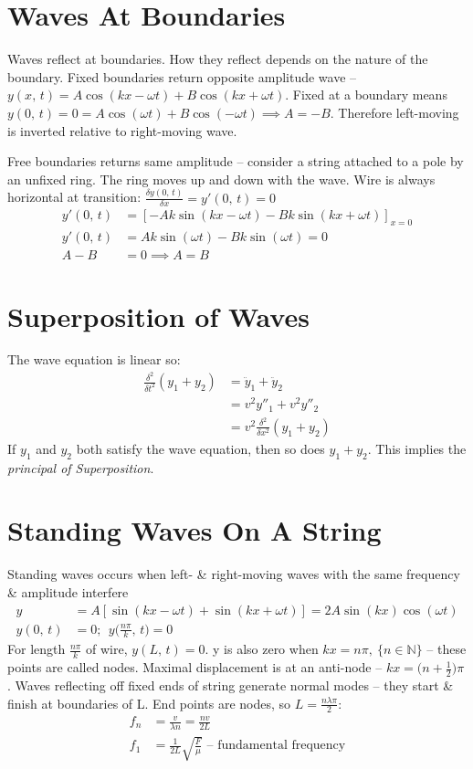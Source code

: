 \documentclass[a4paper, 11pt, normalem]{report}
\begin{document}
\section{Waves At Boundaries}
Waves reflect at boundaries.
How they reflect depends on the nature of the boundary.
Fixed boundaries return opposite amplitude wave -- $y(x,\,t) = A\cos{(kx - \omega t)} + B\cos{(kx + \omega t)}$.
Fixed at a boundary means $y(0,\,t) = 0 = A\cos{(\omega t)} + B\cos{(-\omega t)} \implies A = -B$.
Therefore left-moving is inverted relative to right-moving wave.

Free boundaries returns same amplitude -- consider a string attached to a pole by an unfixed ring.
The ring moves up and down with the wave.
Wire is always horizontal at transition: $\frac{\delta y(0,\,t)}{\delta x} = y'(0,\,t) = 0$
\begin{align}
    y'(0,\,t) &= [-Ak\sin{(kx - \omega t)} - Bk\sin{(kx + \omega t)}]_{x = 0} \\
    y'(0,\,t) &= Ak\sin{(\omega t)} - Bk\sin{(\omega t)} = 0 \\
    A - B &= 0 \implies A = B
\end{align}

\section{Superposition of Waves}
The wave equation is linear so:
\begin{align}
    \frac{\delta^{2}}{\delta t^{2}}(y_{1} + y_{2}) &= \ddot{y}_{1} + \ddot{y}_{2} \\
                                                   &= v^{2}y''_{1} + v^{2}y''_{2} \\
                                                   &= v^{2}\frac{\delta^{2}}{\delta x^{2}}(y_{1} + y_{2})
\end{align}
If $y_{1}$ and $y_{2}$ both satisfy the wave equation, then so does $y_{1} + y_{2}$.
This implies the \emph{principal of Superposition}.

\section{Standing Waves On A String}
Standing waves occurs when left- \& right-moving waves with the same frequency \& amplitude interfere
\begin{align}
    y &= A[\sin{(kx - \omega t)} + \sin{(kx + \omega t)}] = 2A\sin{(kx)}\cos{(\omega t)} \\
    y(0,\,t) &= 0;\;\,y\Big(\frac{n\pi}{k},\,t\Big) = 0
\end{align}
For length $\frac{n\pi}{k}$ of wire, $y(L,\,t) = 0$.
y is also zero when $kx = n\pi,~\{ n \in \mathbb{N}\}$ -- these points are called nodes.
Maximal displacement is at an anti-node -- $kx = \Big(n + \frac{1}{2}\Big)\pi$.
Waves reflecting off fixed ends of string generate normal modes -- they start \& finish at boundaries of L.
End points are nodes, so $L = \frac{n\lambda\pi}{2}$:
\begin{align}
    f_{n} &= \frac{v}{\lambda n} = \frac{nv}{2L} \\
    f_{1} &= \frac{1}{2L}\sqrt{\frac{F}{\mu}}\text{ -- fundamental frequency}
\end{align}
\end{document}
